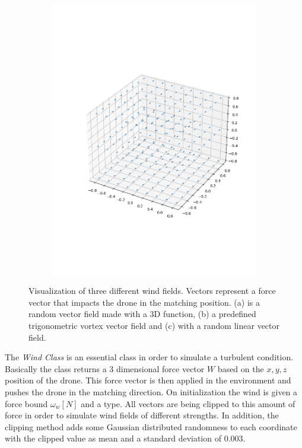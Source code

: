 \begin{figure}
\begin{subfigure}{0.32\linewidth}
		\includegraphics[width=\linewidth]{figures/wind3.png}
		\caption{}
		\label{fig:wind0}
	\end{subfigure}
	\caption{Visualization of three different wind fields. Vectors represent a force vector that impacts the drone in the matching position. 
	(a)  is a random vector field made with a 3D function, 
	(b) a predefined trigonometric vortex vector field and (c) with a random linear vector field.}
\end{figure}
The \emph{Wind Class} is an essential class in order to simulate a turbulent condition. 
Basically the class returns a 3 dimensional force vector $W$ based on the $x,y,z$ position of the drone. 
This force vector is then applied in the environment and pushes the drone in the matching direction. 
On initialization the wind is given a force bound $\omega_w [N]$ and a type. 
All vectors are being clipped to this amount of force in order to simulate wind fields of different strengths. 
In addition, the clipping method adds some Gaussian distributed randomness to each coordinate with the clipped value as mean and a standard deviation of $0.003$. \\
